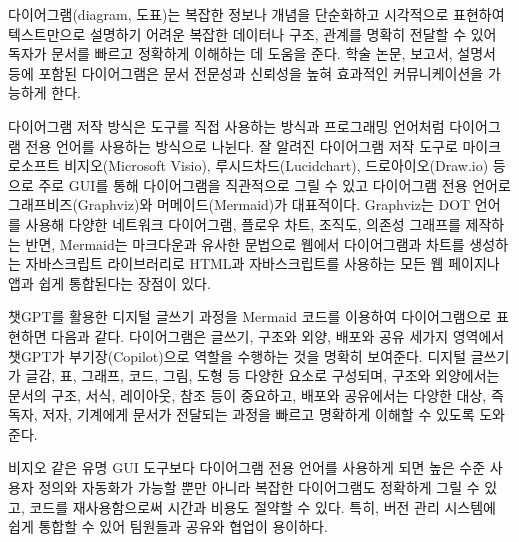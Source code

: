 \documentclass[
  letterpaper,
]{book}
\begin{document}
다이어그램(diagram, 도표)는 복잡한 정보나 개념을 단순화하고 시각적으로
표현하여 텍스트만으로 설명하기 어려운 복잡한 데이터나 구조, 관계를
명확히 전달할 수 있어 독자가 문서를 빠르고 정확하게 이해하는 데 도움을
준다. 학술 논문, 보고서, 설명서 등에 포함된 다이어그램은 문서 전문성과
신뢰성을 높혀 효과적인 커뮤니케이션을 가능하게 한다.

다이어그램 저작 방식은 도구를 직접 사용하는 방식과 프로그래밍 언어처럼
다이어그램 전용 언어를 사용하는 방식으로 나뉜다. 잘 알려진 다이어그램
저작 도구로 마이크로소프트 비지오(Microsoft Visio),
루시드차드(Lucidchart), 드로아이오(Draw.io) 등으로 주로 GUI를 통해
다이어그램을 직관적으로 그릴 수 있고 다이어그램 전용 언어로
그래프비즈(Graphviz)와 머메이드(Mermaid)가 대표적이다. Graphviz는 DOT
언어를 사용해 다양한 네트워크 다이어그램, 플로우 차트, 조직도, 의존성
그래프를 제작하는 반면, Mermaid는 마크다운과 유사한 문법으로 웹에서
다이어그램과 차트를 생성하는 자바스크립트 라이브러리로 HTML과
자바스크립트를 사용하는 모든 웹 페이지나 앱과 쉽게 통합된다는 장점이
있다.

챗GPT를 활용한 디지털 글쓰기 과정을 Mermaid 코드를 이용하여
다이어그램으로 표현하면 다음과 같다. 다이어그램은 글쓰기, 구조와 외양,
배포와 공유 세가지 영역에서 챗GPT가 부기장(Copilot)으로 역할을 수행하는
것을 명확히 보여준다. 디지털 글쓰기가 글감, 표, 그래프, 코드, 그림, 도형
등 다양한 요소로 구성되며, 구조와 외양에서는 문서의 구조, 서식,
레이아웃, 참조 등이 중요하고, 배포와 공유에서는 다양한 대상, 즉 독자,
저자, 기계에게 문서가 전달되는 과정을 빠르고 명확하게 이해할 수 있도록
도와준다.

비지오 같은 유명 GUI 도구보다 다이어그램 전용 언어를 사용하게 되면 높은
수준 사용자 정의와 자동화가 가능할 뿐만 아니라 복잡한 다이어그램도
정확하게 그릴 수 있고, 코드를 재사용함으로써 시간과 비용도 절약할 수
있다. 특히, 버전 관리 시스템에 쉽게 통합할 수 있어 팀원들과 공유와
협업이 용이하다.
\end{document}
